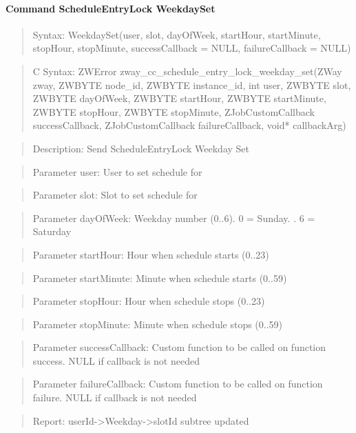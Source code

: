 \paragraph{Command ScheduleEntryLock WeekdaySet}
\begin{quote}Syntax: WeekdaySet(user, slot, dayOfWeek, startHour, startMinute, stopHour, stopMinute, successCallback = NULL, failureCallback = NULL)\end{quote}
\begin{quote}C Syntax: ZWError zway\_cc\_schedule\_entry\_lock\_weekday\_set(ZWay zway, ZWBYTE node\_id, ZWBYTE instance\_id, int user, ZWBYTE slot, ZWBYTE dayOfWeek, ZWBYTE startHour, ZWBYTE startMinute, ZWBYTE stopHour, ZWBYTE stopMinute, ZJobCustomCallback successCallback, ZJobCustomCallback failureCallback, void* callbackArg)\end{quote}
\begin{quote}Description: Send ScheduleEntryLock Weekday Set\end{quote}
\begin{quote}Parameter user: User to set schedule for\end{quote}
\begin{quote}Parameter slot: Slot to set schedule for\end{quote}
\begin{quote}Parameter dayOfWeek: Weekday number (0..6). 0 = Sunday. . 6 = Saturday\end{quote}
\begin{quote}Parameter startHour: Hour when schedule starts (0..23)\end{quote}
\begin{quote}Parameter startMinute: Minute when schedule starts (0..59)\end{quote}
\begin{quote}Parameter stopHour: Hour when schedule stops (0..23)\end{quote}
\begin{quote}Parameter stopMinute: Minute when schedule stops (0..59)\end{quote}
\begin{quote}Parameter successCallback: Custom function to be called on function success. NULL if callback is not needed\end{quote}
\begin{quote}Parameter failureCallback: Custom function to be called on function failure. NULL if callback is not needed\end{quote}
\begin{quote}Report: userId->Weekday->slotId subtree updated\end{quote}

